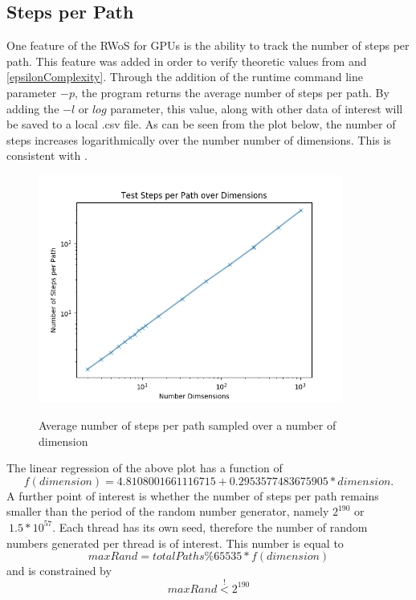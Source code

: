 \subsection{Steps per Path}
One feature of the \Gls{RWoS} for \Glspl{GPU} is the ability to track the number of
steps per path.  This feature was added in order to verify theoretic values from \cite{Bornemann,DeLaurentis} and
\ref{epsilonComplexity}.  Through the addition of the runtime command line parameter
$-p$, the program returns the average number of steps per path.  By adding the $-l$
or  \textendash$log$
parameter, this value, along with other data of interest will be saved to a local
.csv file.  As can be seen from the plot below, the number of steps increases
logarithmically over the number number of dimensions.  This is consistent with \cite{Bornemann, DeLaurentis}.
\begin{figure}
\begin{center}
\includegraphics[width=10.0cm]{styles/pathsPerDim} \label{plot:pathsPerDim}
  \caption{Average number of steps per path sampled over a number of dimension}
\end{center}
\end{figure}
The linear regression of the above plot has a function of $$f(dimension)= 4.8108001661116715 + 0.2953577483675905*dimension.$$
A further point of interest is whether the number of steps per path remains smaller
than the period of the random number generator, namely $2^{190}$ or $~1.5 * 10^{57}$.
Each thread has its own seed, therefore the number of random numbers generated per
thread is of interest.  This number is equal to
$$maxRand = total Paths \% 65535 * f(dimension)$$ and is constrained by
$$ maxRand \overset{!}{<} 2^{190}$$


